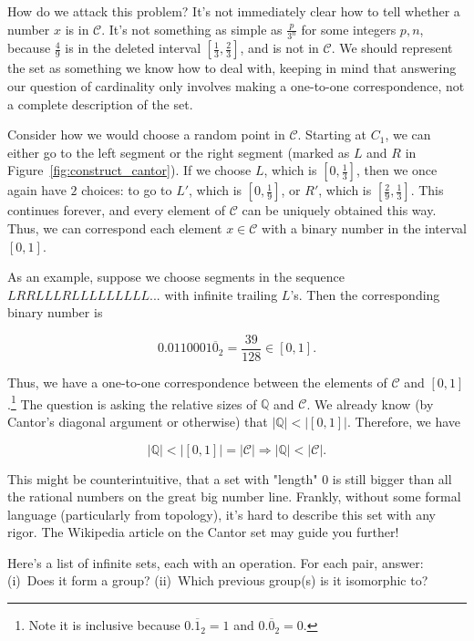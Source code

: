 \documentclass[../key.tex]{subfiles}
\begin{document}
\noindent How do we attack this problem? It's not immediately clear how to tell whether a number $x$ is in $\mathcal{C}$. It's not something as simple as $\frac{p}{3^n}$ for some integers $p,n$, because $\frac{4}{9}$ is in the deleted interval $\left[\frac{1}{3},\frac{2}{3}\right]$, and is not in $\mathcal{C}$. We should represent the set as something we know how to deal with, keeping in mind that answering our question of cardinality only involves making a one-to-one correspondence, not a complete description of the set.

Consider how we would choose a random point in $\mathcal{C}$. Starting at $C_1$, we can either go to the left segment or the right segment (marked as $L$ and $R$ in Figure~\ref{fig:construct_cantor}). If we choose $L$, which is $\left[0, \frac{1}{3}\right]$, then we once again have $2$ choices: to go to $L'$, which is $\left[0,
\frac{1}{9}\right]$, or $R'$, which is $\left[\frac{2}{9},\frac{1}{3}\right]$. This continues forever, and every element of $\mathcal{C}$ can be uniquely obtained this way. Thus, we can correspond each element $x\in \mathcal{C}$ with a binary number in the interval $[0,1]$.

As an example, suppose we choose segments in the sequence $LRRLLLRLLLLLLLLL...$ with infinite trailing $L$'s. Then the corresponding binary number is

$$0.0110001\overline{0}_2=\frac{39}{128}\in [0,1].$$ 

\noindent Thus, we have a one-to-one correspondence between the elements of $\mathcal{C}$ and $[0,1]$.\footnote{Note it is inclusive because $0.\overline{1}_2=1$ and $0.\overline{0}_2=0$.} The question is asking the relative sizes of $\mathbb{Q}$ and $\mathcal{C}$. We already know (by Cantor's diagonal argument or otherwise) that $|\mathbb{Q}| < |[0,1]|$. Therefore, we have

$$|\mathbb{Q}| < |[0,1]| = |\mathcal{C}| \Longrightarrow |\mathbb{Q}| < |\mathcal{C}|.$$

\noindent This might be counterintuitive, that a set with "length" $0$ is still bigger than all the rational numbers on the great big number line. Frankly, without some formal language (particularly from topology), it's hard to describe this set with any rigor. The Wikipedia article on the Cantor set may guide you further!

\begin{outer_problem}
\item Here’s a list of infinite sets, each with an operation. For each pair, answer: (i)~Does it form a group? (ii)~Which previous group(s) is it isomorphic to?
\end{outer_problem}
\end{document}
